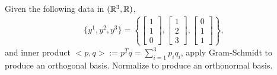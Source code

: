 \begin{example} Given the following data in $(\mathbb R^3,\mathbb R)$, 
\begin{gather*}
	\{ y^1, y^2, y^3 \} = \left\{
		\left[ \begin{array}{c} 1 \\ 1 \\ 0 \end{array} \right],
		\left[ \begin{array}{c} 1 \\ 2 \\ 3 \end{array} \right],
		\left[ \begin{array}{c} 0 \\ 1 \\ 1 \end{array} \right]
		\right\},
\end{gather*}
and inner product $<p,q> := p^T q = \sum_{i=1}^3 p_i q_i$, apply Gram-Schmidt to produce an orthogonal basis. Normalize to produce an orthonormal basis.
\end{example}

